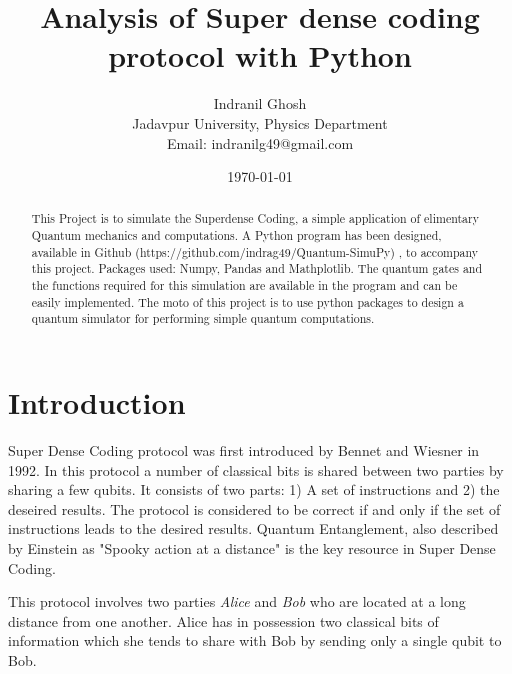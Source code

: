 \documentclass{article}
\title{\textbf{Analysis of Super dense coding protocol with Python}}
\author{Indranil Ghosh\\Jadavpur University, Physics Department\\Email: indranilg49@gmail.com}
\date{\today}
\begin{document}
\maketitle

\begin{abstract}
This Project is to simulate the  Superdense Coding, a simple application of elimentary Quantum mechanics and computations. A Python program has been designed, available in Github (https://github.com/indrag49/Quantum-SimuPy) , to accompany this project. Packages used: Numpy, Pandas and Mathplotlib. The quantum gates and the functions required for this simulation are available in the program and can be easily implemented. The moto of this project is to use python packages to design a quantum simulator for performing simple quantum computations.
\end{abstract}

\section{Introduction}
Super Dense Coding protocol was first introduced by Bennet and Wiesner in 1992. In this protocol a number of classical bits is shared between two parties by sharing a few qubits. It consists of two parts: 1) A set of instructions and 2) the deseired results. The protocol is considered to be correct if and only if the set of instructions leads to the desired results. Quantum Entanglement, also described by Einstein as "Spooky action at a distance" is the key resource in Super Dense Coding.  \\ \par
This protocol involves two parties \textit{Alice} and \textit{Bob} who are located at a long distance from one another. Alice has in possession two classical bits of information which she tends to share with  Bob by sending only a single qubit to Bob.
\end{document}
